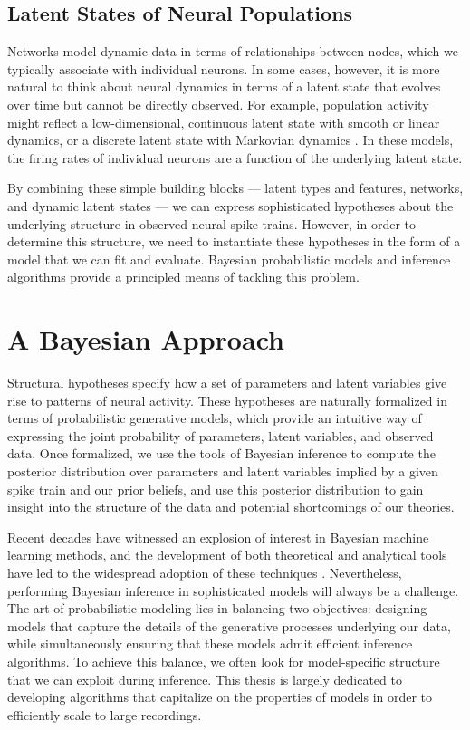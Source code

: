 \subsection{Latent States of Neural Populations}
Networks model dynamic data in terms of relationships between nodes,
which we typically associate with individual neurons. In some cases,
however, it is more natural to think about neural dynamics in terms of
a latent state that evolves over time but cannot be directly
observed. For example, population activity might reflect a
low-dimensional, continuous latent state with smooth \citep{Yu09} or
linear \citep{Smith-2003, paninski2010new} dynamics, or a discrete
latent state with Markovian dynamics \citep[e.g.][]{jones2007natural,
  latimer2015single}.  In these models, the firing rates of individual
neurons are a function of the underlying latent state.

By combining these simple building blocks --- latent types and features, 
networks, and dynamic latent states --- we can express sophisticated 
hypotheses about the underlying structure in observed neural spike trains. 
However, in order to determine this structure, we need to instantiate these 
hypotheses in the form of a model that we can fit and evaluate.
Bayesian probabilistic models and inference algorithms provide a principled 
means of tackling this problem.


\section{A Bayesian Approach} 
Structural hypotheses specify how a set of parameters and latent
variables give rise to patterns of neural activity.  These hypotheses
are naturally formalized in terms of probabilistic generative models,
which provide an intuitive way of expressing the joint probability of
parameters, latent variables, and observed data.  Once formalized, we
use the tools of Bayesian inference to compute the posterior
distribution over parameters and latent variables implied by a given
spike train and our prior beliefs, and use this posterior distribution
to gain insight into the structure of the data and potential
shortcomings of our theories.

Recent decades have witnessed an explosion of interest in Bayesian
machine learning methods, and the development of both theoretical and
analytical tools have led to the widespread adoption of these
techniques \citep{bishop2006pattern, murphy2012probabilistic}.
Nevertheless, performing Bayesian inference in sophisticated models
will always be a challenge. The art of probabilistic modeling lies in
balancing two objectives: designing models that capture the details of
the generative processes underlying our data, while simultaneously
ensuring that these models admit efficient inference algorithms. To
achieve this balance, we often look for model-specific structure that
we can exploit during inference.  This thesis is largely dedicated to
developing algorithms that capitalize on the properties of models in
order to efficiently scale to large recordings.


